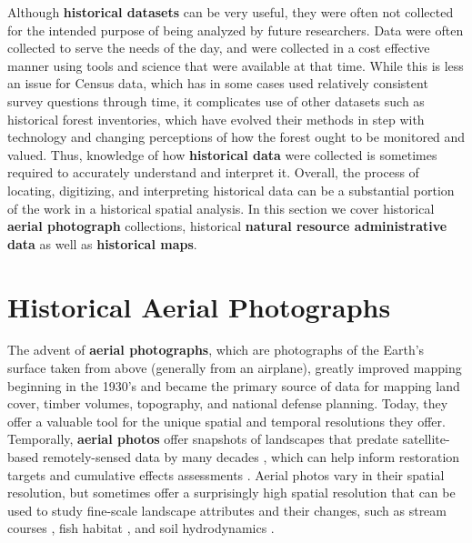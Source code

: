 \documentclass[
]{book}
\begin{document}
Although \textbf{historical datasets} can be very useful, they were often not collected for the intended purpose of being analyzed by future researchers. Data were often collected to serve the needs of the day, and were collected in a cost effective manner using tools and science that were available at that time. While this is less an issue for Census data, which has in some cases used relatively consistent survey questions through time, it complicates use of other datasets such as historical forest inventories, which have evolved their methods in step with technology and changing perceptions of how the forest ought to be monitored and valued. Thus, knowledge of how \textbf{historical data} were collected is sometimes required to accurately understand and interpret it. Overall, the process of locating, digitizing, and interpreting historical data can be a substantial portion of the work in a historical spatial analysis. In this section we cover historical \textbf{aerial photograph} collections, historical \textbf{natural resource administrative data} as well as \textbf{historical maps}.

\hypertarget{historical-aerial-photographs}{%
\section{Historical Aerial Photographs}\label{historical-aerial-photographs}}

The advent of \textbf{aerial photographs}, which are photographs of the Earth's surface taken from above (generally from an airplane), greatly improved mapping beginning in the 1930's and became the primary source of data for mapping land cover, timber volumes, topography, and national defense planning. Today, they offer a valuable tool for the unique spatial and temporal resolutions they offer. Temporally, \textbf{aerial photos} offer snapshots of landscapes that predate satellite-based remotely-sensed data by many decades \citep{morgan_historical_2017}, which can help inform restoration targets and cumulative effects assessments \citep{harker_perspectives_2021}. Aerial photos vary in their spatial resolution, but sometimes offer a surprisingly high spatial resolution that can be used to study fine-scale landscape attributes and their changes, such as stream courses \citep{little_channel_2013}, fish habitat \citep{tomlinson_long-term_2011}, and soil hydrodynamics \citep{harker_perspectives_2021}.
\end{document}
